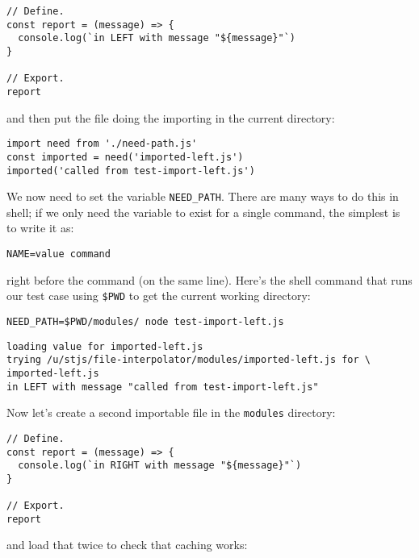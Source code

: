 \documentclass[krantzl]{krantz}
\begin{document}
\begin{lstlisting}[frame=tblr]
// Define.
const report = (message) => {
  console.log(`in LEFT with message "${message}"`)
}

// Export.
report
\end{lstlisting}



\noindent and then put the file doing the importing in the current directory:


\begin{lstlisting}[frame=tblr]
import need from './need-path.js'
const imported = need('imported-left.js')
imported('called from test-import-left.js')
\end{lstlisting}



We now need to set the variable \texttt{NEED\_PATH}.
There are many ways to do this in shell;
if we only need the variable to exist for a single command,
the simplest is to write it as:

\begin{lstlisting}[frame=tblr]
NAME=value command
\end{lstlisting}


\noindent right before the command (on the same line).
Here’s the shell command that runs our test case
using \texttt{\$PWD} to get the current working directory:


\begin{lstlisting}[frame=shadowbox]
NEED_PATH=$PWD/modules/ node test-import-left.js
\end{lstlisting}



\begin{lstlisting}[frame=tblr,backgroundcolor=\color{black!5}]
loading value for imported-left.js
trying /u/stjs/file-interpolator/modules/imported-left.js for \
imported-left.js
in LEFT with message "called from test-import-left.js"
\end{lstlisting}



Now let’s create a second importable file in the \texttt{modules} directory:


\begin{lstlisting}[frame=tblr]
// Define.
const report = (message) => {
  console.log(`in RIGHT with message "${message}"`)
}

// Export.
report
\end{lstlisting}



\noindent and load that twice to check that caching works:
\end{document}
